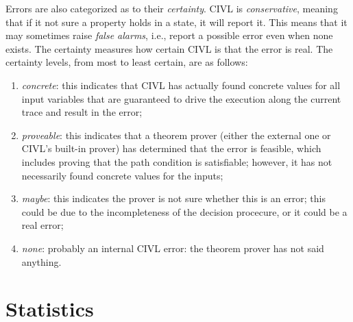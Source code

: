 Errors are also categorized as to their \emph{certainty}.  CIVL is
\emph{conservative}, meaning that if it not sure a property holds in a
state, it will report it.  This means that it may sometimes raise
\emph{false alarms}, i.e., report a possible error even when none
exists. The certainty measures how certain CIVL is that the error is
real.  The certainty levels, from most to least certain, are as
follows:
\begin{enumerate}
\item \emph{concrete}: this indicates that CIVL has actually found
  concrete
  values for all input variables that are guaranteed to drive the
  execution along the current trace and result in the error;
\item \emph{proveable}: this indicates that a theorem prover (either
  the external one or CIVL's built-in prover) has determined that
  the error is feasible, which includes proving that the path condition
  is satisfiable; however, it has not necessarily found concrete
  values for the inputs;
\item \emph{maybe}: this indicates the prover is not sure whether this
  is an error; this could be due to the incompleteness of the decision
  procecure, or it could be a real error;
\item \emph{none}: probably an internal CIVL error: the theorem prover
  has not said anything.
\end{enumerate}

\section{Statistics}

